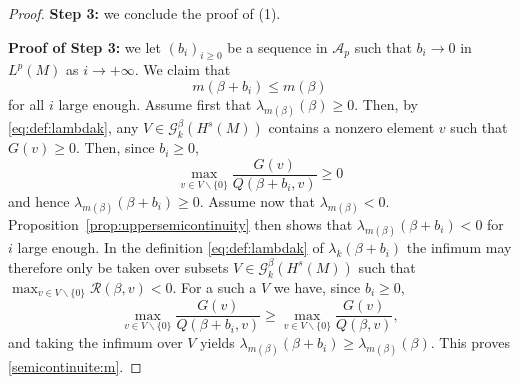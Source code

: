 \documentclass[10pt,a4paper]{amsart}
\newcommand{\vp}{{\rm vp}}
\begin{document}
\begin{proof}
\medskip

\textbf{Step 3:} we conclude the proof of (1). 

\medskip 

\textbf{Proof of Step 3:} we let $(b_i)_{i \ge 0}$ be a sequence in $\mathcal{A}_p$ such that $b_i \to 0$ in $L^p(M)$ as $ i \to + \infty$. We claim that 
\begin{equation} \label{semicontinuite:m}
m(\beta+ b_i) \le m(\beta)
\end{equation} 
for all $i$ large enough. Assume first that $\lambda_{m(\beta)}(\beta) \ge 0$. Then, by \eqref{eq:def:lambdak}, any $V \in \mathcal{G}_k^{\beta}(H^s(M))$ contains a nonzero element $v$ such that $G(v) \ge 0$. Then, since $b_i \ge 0$, 
$$\max_{v \in V \backslash \{0\}} \frac{G(v)}{Q(\beta + b_i, v)} \ge0$$ 
and hence $\lambda_{m(\beta)}(\beta+b_i) \ge 0$. Assume now that $\lambda_{m(\beta)} <0$. Proposition~\ref{prop:uppersemicontinuity} then shows that $\lambda_{m(\beta)}(\beta + b_i) < 0$ for $i$ large enough. In the definition \eqref{eq:def:lambdak} of $\lambda_k(\beta + b_i)$ the infimum may therefore only be taken over subsets $V \in \mathcal{G}_k^{\beta}(H^s(M))$ such that $\max_{v \in V \backslash \{0\}} \mathcal{R}(\beta, v)  <0$. For a such a $V$ we have, since $b_i \ge 0$, 
$$\max_{v \in V \backslash \{0\}} \frac{G(v)}{Q(\beta + b_i, v)} \ge \max_{v \in V \backslash \{0\}} \frac{G(v)}{Q(\beta,v)},$$
and taking the infimum over $V$ yields $\lambda_{m(\beta)}(\beta + b_i) \ge \lambda_{m(\beta)}(\beta)$. This proves \eqref{semicontinuite:m}. 

\end{proof}
\end{document}
